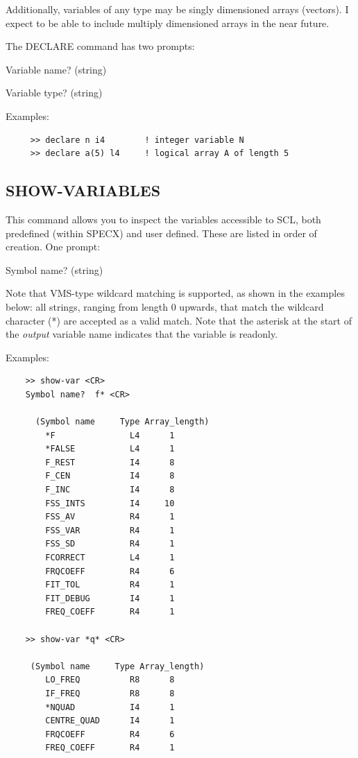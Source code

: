 \documentclass[11pt,twoside]{report}
\begin{document}
Additionally, variables of any type may be singly dimensioned arrays (vectors).
I expect to be able to include multiply dimensioned arrays in the near future.

The DECLARE command has two prompts:
\begin{description}
\item{}   Variable name?   (string)
\item{}   Variable type?   (string)
\end{description}

Examples:
\begin{verbatim}
     >> declare n i4        ! integer variable N
     >> declare a(5) l4     ! logical array A of length 5
\end{verbatim}


\subsection{SHOW-VARIABLES}

This command allows you to inspect the variables accessible to SCL,
both predefined (within SPECX) and user defined. These are listed in order of
creation. One prompt:
\begin{description}
\item{}           Symbol name?  (string)
\end{description}
Note that VMS-type wildcard matching is supported, as shown in the examples
below: all strings, ranging from length 0 upwards, that match the wildcard
character (*) are accepted as a valid match. Note that the asterisk at the
start of the {\em output} variable name indicates that the variable is
readonly.

Examples:
\begin{verbatim}
    >> show-var <CR>
    Symbol name?  f* <CR>

      (Symbol name     Type Array_length)
        *F               L4      1
        *FALSE           L4      1
        F_REST           I4      8
        F_CEN            I4      8
        F_INC            I4      8
        FSS_INTS         I4     10
        FSS_AV           R4      1
        FSS_VAR          R4      1
        FSS_SD           R4      1
        FCORRECT         L4      1
        FRQCOEFF         R4      6
        FIT_TOL          R4      1
        FIT_DEBUG        I4      1
        FREQ_COEFF       R4      1

    >> show-var *q* <CR>

     (Symbol name     Type Array_length)
        LO_FREQ          R8      8
        IF_FREQ          R8      8
        *NQUAD           I4      1
        CENTRE_QUAD      I4      1
        FRQCOEFF         R4      6
        FREQ_COEFF       R4      1

\end{verbatim}
\end{document}

